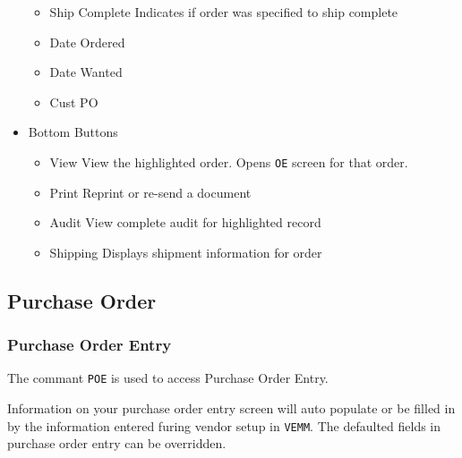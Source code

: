 \begin{itemize}
\begin{itemize}
		\item Ship Complete \textemdash Indicates if order was specified to ship complete
		\item Date Ordered
		\item Date Wanted
		\item Cust PO
	\end{itemize}
	\item Bottom Buttons
	\begin{itemize}
		\item View \textemdash View the highlighted order. Opens \texttt{OE} screen for that order.
		\item Print \textemdash Reprint or re-send a document
		\item Audit \textemdash View complete audit for highlighted record
		\item Shipping \textemdash Displays shipment information for order
	\end{itemize}
\end{itemize}

\subsection{Purchase Order}

\subsubsection{Purchase Order Entry}


The commant \texttt{POE} is used to access Purchase Order Entry.

Information on your purchase order entry screen will auto populate or be filled in by the information entered furing vendor setup in \texttt{VEMM}. The defaulted fields in purchase order entry can be overridden.

